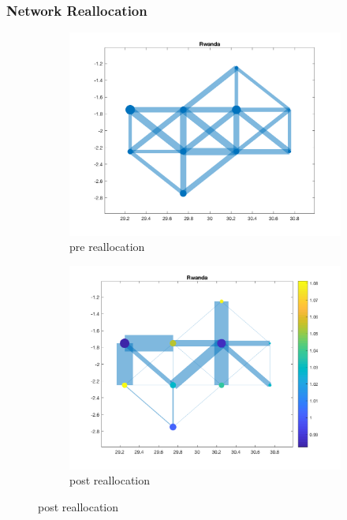 \documentclass[]{beamer}   	%
\begin{document}
\begin{frame}
  \frametitle{Network Reallocation}
\begin{figure}
\begin{subfigure}[c]{0.48\textwidth}
\includegraphics[width=\textwidth, trim={2cm 1cm 1.5cm 0cm},clip]{../../Build/output/Matlab_graphs/Nicer_graphs/Rwanda_stat.png}
\caption{pre reallocation}
\label{fig:cae_pre}
\end{subfigure}
\begin{subfigure}[c]{0.48\textwidth}
\includegraphics[width=\textwidth, trim={2cm 1cm 1.5cm 0cm},clip]{../../Build/output/Matlab_graphs/Nicer_graphs/Rwanda_opt.png}
\caption{post reallocation}
\label{fig:cae_post}
\end{subfigure}
\end{figure}
\end{frame}
\end{document}
